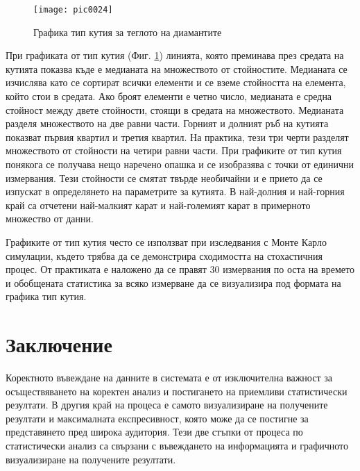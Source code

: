 \begin{figure}[h!]
  \centering
  \texttt{[image: pic0024]}
  \caption{Графика тип кутия за теглото на диамантите}
\label{figure0024}
\end{figure}
\FloatBarrier

При графиката от тип кутия (Фиг. \ref{figure0024}) линията, която преминава през средата на кутията показва къде е медианата на множеството от стойностите. Медианата се изчислява като се сортират всички елементи и се вземе стойността на елемента, който стои в средата. Ако броят елементи е четно число, медианата е средна стойност между двете стойности, стоящи в средата на множеството. Медианата разделя множеството на две равни части. Горният и долният ръб на кутията показват първия квартил и третия квартил. На практика, тези три черти разделят множеството от стойности на четири равни части. При графиките от тип кутия понякога се получава нещо наречено опашка и се изобразява с точки от единични измервания. Тези стойности се смятат твърде необичайни и е прието да се изпускат в определянето на параметрите за кутията. В най-долния и най-горния край са отчетени най-малкият карат и най-големият карат в примерното множество от данни.

Графиките от тип кутия често се използват при изследвания с Монте Карло симулации, където трябва да се демонстрира сходимостта на стохастичния процес. От практиката е наложено да се правят 30 измервания по оста на времето и обобщената статистика за всяко измерване да се визуализира под формата на графика тип кутия.

\section*{Заключение}

Коректното въвеждане на данните в системата е от изключителна важност за осъществяването на коректен анализ и постигането на приемливи статистически резултати. В другия край на процеса е самото визуализиране на получените резултати и максималната експресивност, която може да се постигне за представянето пред широка аудитория. Тези две стъпки от процеса по статистически анализ са свързани с въвеждането на информацията и графичното визуализиране на получените резултати.

